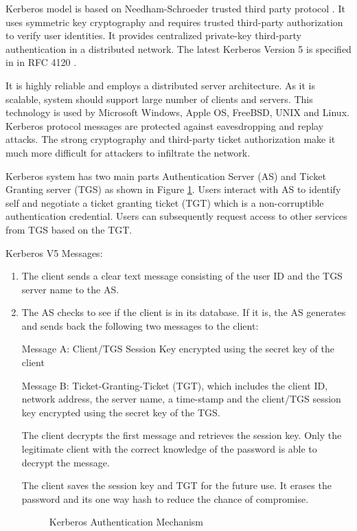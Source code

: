 \begin{multicols}{2}
Kerberos model is based on Needham-Schroeder trusted third party protocol \cite{key1}. It uses symmetric key cryptography and requires trusted third-party authorization to verify user identities. It provides centralized private-key third-party authentication in a distributed network. The latest Kerberos Version 5 is specified in in RFC 4120 \cite{key12}.

It is highly reliable and employs a distributed server architecture. As it is scalable, system should support large number of clients and servers. This technology is used by Microsoft Windows, Apple OS, FreeBSD, UNIX and Linux. Kerberos protocol messages are protected against eavesdropping and replay attacks. The strong cryptography and third-party ticket authorization make it much more difficult for attackers to infiltrate the network.

Kerberos system has two main parts Authentication Server (AS) and Ticket Granting server (TGS) as shown in Figure \ref{chap2-fig3}. Users interact with AS to identify self and negotiate a ticket granting ticket (TGT) which is a non-corruptible authentication credential. Users can subsequently request access to other services from TGS based on the TGT.

Kerberos V5 Messages:
\begin{enumerate}
\item The client sends a clear text message consisting of the user ID and the TGS server name to the AS.
\item The AS checks to see if the client is in its database. If it is, the AS generates and sends back the following two messages to the client:

Message A: Client/TGS Session Key encrypted using the secret key of the client

Message B: Ticket-Granting-Ticket (TGT), which includes the client ID, network address, the server name, a time-stamp and the client/TGS session key encrypted using the secret key of the TGS.

The client decrypts the first message and retrieves the session key. Only the legitimate client with the correct knowledge of the password is able to decrypt the message.

The client saves the session key and TGT for the future use. It erases the password and its one way hash to reduce the chance of compromise.
\begin{figure}[!ht]
\centering
\caption{Kerberos Authentication Mechanism}\label{chap2-fig3}
\end{figure}


\end{enumerate}
\end{multicols}
